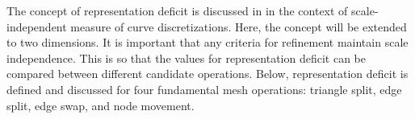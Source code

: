 The concept of representation deficit is discussed in \cite{mclaurin13}
in the context of scale-independent measure of curve discretizations.
Here, the concept will be extended to two dimensions. It is important
that any criteria for refinement maintain scale independence. This is so
that the values for representation deficit can be compared between
different candidate operations. Below, representation deficit is defined
and discussed for four fundamental mesh operations: triangle split, edge
split, edge swap, and node movement.
